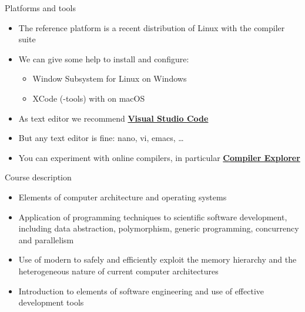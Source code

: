 \begin{frame}{Platforms and tools}
  \begin{itemize}[<+->]
  \item The reference platform is a recent distribution of Linux with the
     compiler suite
  \item We can give some help to install and configure:
    \begin{itemize}[<.->]
    \item Window Subsystem for Linux on Windows
    \item XCode (-tools) with  on macOS
    \end{itemize}
  \item As text editor we recommend
    \href{https://code.visualstudio.com/}{\textbf{Visual Studio Code}}
  \item But any text editor is fine: nano, vi, emacs, \ldots
  \item You can experiment with online compilers, in particular
    \href{https://godbolt.org/}{\textbf{Compiler Explorer}}
  \end{itemize}
\end{frame}

\begin{frame}{Course description}

  \begin{itemize}
  \item Elements of computer architecture and operating systems
  \item Application of \Cpp{} programming techniques to scientific software
    development, including data abstraction, polymorphism, generic programming,
    concurrency and parallelism
  \item Use of modern \Cpp{} to safely and efficiently exploit the memory
    hierarchy and the heterogeneous nature of current computer architectures
  \item Introduction to elements of software engineering and use of effective
    development tools
  \end{itemize}

\end{frame}
